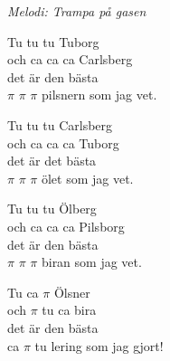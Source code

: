 {\footnotesize\textit{Melodi: Trampa på gasen}}\par
\vspace{10pt}
Tu tu tu Tuborg\\
och ca ca ca Carlsberg\\
det är den bästa\\
$\pi$ $\pi$ $\pi$ pilsnern som jag vet.\par
\vspace{10pt}
Tu tu tu Carlsberg\\
och ca ca ca Tuborg\\
det är det bästa\\
$\pi$ $\pi$ $\pi$ ölet som jag vet.\par
\vspace{10pt}
Tu tu tu Ölberg\\
och ca ca ca Pilsborg\\
det är den bästa\\
$\pi$ $\pi$ $\pi$ biran som jag vet.\par
\vspace{10pt}
Tu ca $\pi$ Ölsner\\
och $\pi$ tu ca bira\\
det är den bästa\\
ca $\pi$ tu lering som jag gjort!
